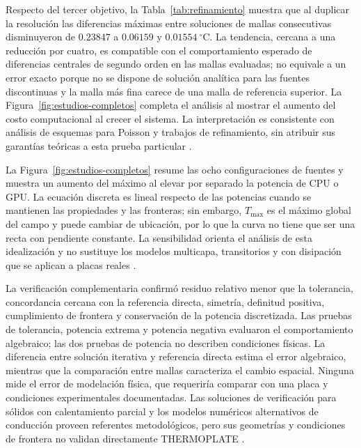 Respecto del tercer objetivo, la Tabla~\ref{tab:refinamiento} muestra que al duplicar la resoluci\'on las diferencias m\'aximas entre soluciones de mallas consecutivas disminuyeron de $0.23847$ a $0.06159$ y $0.01554\ ^\circ$C. La tendencia, cercana a una reducci\'on por cuatro, es compatible con el comportamiento esperado de diferencias centrales de segundo orden en las mallas evaluadas; no equivale a un error exacto porque no se dispone de soluci\'on anal\'itica para las fuentes discontinuas y la malla m\'as fina carece de una malla de referencia superior. La Figura~\ref{fig:estudios-completos} completa el an\'alisis al mostrar el aumento del costo computacional al crecer el sistema. La interpretaci\'on es consistente con an\'alisis de esquemas para Poisson y trabajos de refinamiento, sin atribuir sus garant\'ias te\'oricas a esta prueba particular \citep{settle2013compact,chen2007supra,raeli2018hierarchical,batty2017cell}.

La Figura~\ref{fig:estudios-completos} resume las ocho configuraciones de fuentes y muestra un aumento del m\'aximo al elevar por separado la potencia de CPU o GPU. La ecuaci\'on discreta es lineal respecto de las potencias cuando se mantienen las propiedades y las fronteras; sin embargo, $T_{\max}$ es el m\'aximo global del campo y puede cambiar de ubicaci\'on, por lo que la curva no tiene que ser una recta con pendiente constante. La sensibilidad orienta el an\'alisis de esta idealizaci\'on y no sustituye los modelos multicapa, transitorios y con disipaci\'on que se aplican a placas reales \citep{chung2001materials,zheng2021advances,harvest2007devices,moniervinard2015pcb}.

La verificaci\'on complementaria confirm\'o residuo relativo menor que la tolerancia, concordancia cercana con la referencia directa, simetr\'ia, definitud positiva, cumplimiento de frontera y conservaci\'on de la potencia discretizada. Las pruebas de tolerancia, potencia extrema y potencia negativa evaluaron el comportamiento algebraico; las dos pruebas de potencia no describen condiciones f\'isicas. La diferencia entre soluci\'on iterativa y referencia directa estima el error algebraico, mientras que la comparaci\'on entre mallas caracteriza el cambio espacial. Ninguna mide el error de modelaci\'on f\'isica, que requerir\'ia comparar con una placa y condiciones experimentales documentadas. Las soluciones de verificaci\'on para s\'olidos con calentamiento parcial y los modelos num\'ericos alternativos de conducci\'on proveen referentes metodol\'ogicos, pero sus geometr\'ias y condiciones de frontera no validan directamente THERMOPLATE \citep{beck2004verification,akeremale2020finite,reutskiy2016meshless,deng2017high}.
